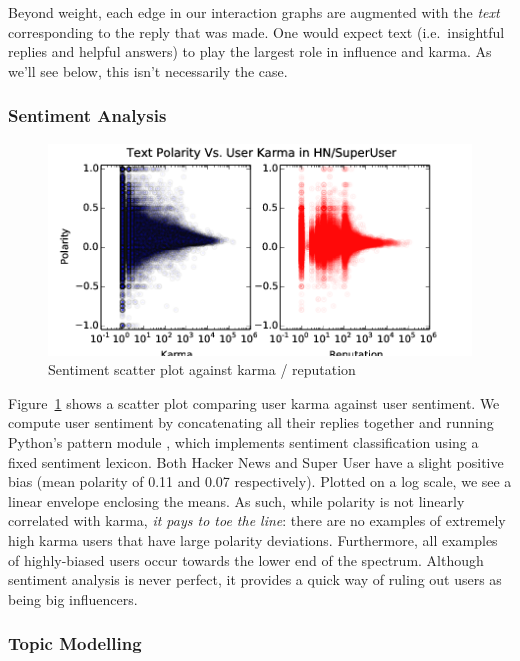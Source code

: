 \documentclass[11pt]{article}
\begin{document}
Beyond weight, each edge in our interaction graphs are augmented with the
\textit{text} corresponding to the reply that was made. One would expect 
text (i.e.\ insightful replies and helpful answers) to play the largest role 
in influence and karma. As we'll see below, this isn't necessarily the case.

\subsubsection{Sentiment Analysis}
\label{sec:sentiment}
\begin{figure}[h]
\centering
\includegraphics[width=\linewidth]{text_polarity-png}
\caption{Sentiment scatter plot against karma / reputation}
\label{fig:sentiment}
\end{figure}

Figure~\ref{fig:sentiment} shows a scatter plot comparing user karma
against user sentiment. We compute user sentiment by concatenating all
their replies together and running Python's pattern module \citet{de2012pattern}, 
which implements sentiment classification using a fixed sentiment lexicon.  Both
Hacker News and Super User have a slight positive bias (mean polarity of 0.11 and
0.07 respectively). Plotted on a log scale, we see a linear envelope enclosing
the means. As such, while polarity is not linearly correlated with karma,
\textit{it pays to toe the line}: there are no examples of extremely high karma
users that have large polarity deviations. Furthermore, all examples of
highly-biased users occur towards the lower end of the spectrum. Although
sentiment analysis is never perfect, it provides a quick way of ruling out users
as being big influencers.

\subsubsection{Topic Modelling}
\end{document}
